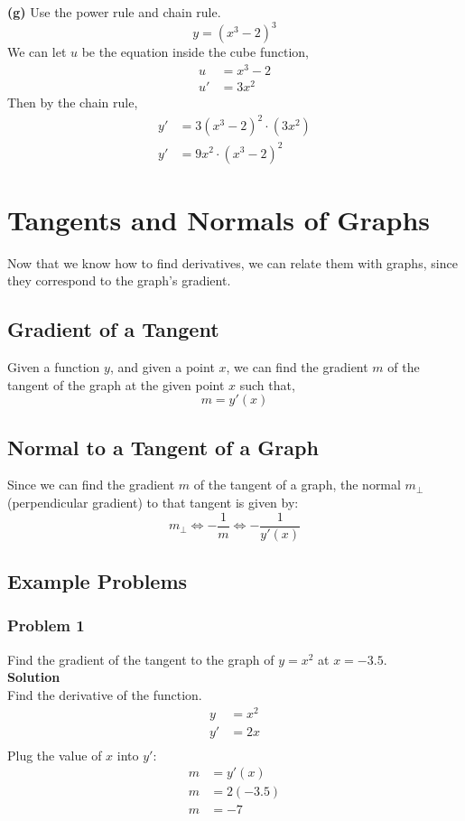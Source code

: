 \documentclass[hidelinks, a4paper, 12pt]{article}
\newcommand{\biimp}{\Leftrightarrow}
\newcommand{\bd}{\textbf}
\newcommand{\n}{\\[\baselineskip]}
\begin{document}
                \bd{(g)} Use the power rule and chain rule.
                \[y = (x^3-2)^3\]
                We can let $u$ be the equation inside the cube function,
                \[\begin{split}
                    u &= x^3-2\\
                    u' &= 3x^2
                \end{split}\]
                Then by the chain rule,
                \[\begin{split}
                    y' &= 3(x^3-2)^2\cdot(3x^2)\\
                    y' &= 9x^2\cdot(x^3-2)^2
                \end{split}\]
    
    \section{Tangents and Normals of Graphs}
        Now that we know how to find derivatives, we can relate them with graphs, since they correspond to the graph's
        gradient.
        \subsection{Gradient of a Tangent}
            Given a function $y$, and given a point $x$, we can find the gradient $m$ of the tangent of the graph at the given point $x$ such that,
            \[m = y'(x)\]

        \subsection{Normal to a Tangent of a Graph}
            Since we can find the gradient $m$ of the tangent of a graph, the normal $m_{\perp}$ (perpendicular gradient) to that tangent is given by:
            \[m_{\perp} \biimp -\frac{1}{m} \biimp -\frac{1}{y'(x)}\]
        
        \subsection{Example Problems}
            \subsubsection{Problem 1}
                Find the gradient of the tangent to the graph of $y = x^2$ at $x = -3.5$.\n
                \bd{Solution}\n
                Find the derivative of the function.
                \[\begin{split}
                    y &= x^2\\
                    y' &= 2x\\
                \end{split}\]
                Plug the value of $x$ into $y'$:
                \[\begin{split}
                    m &= y'(x)\\
                    m &= 2(-3.5)\\
                    m &= -7
                \end{split}\]
\end{document}
